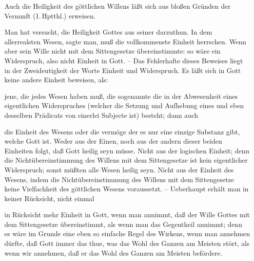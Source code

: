 Auch die Heiligkeit des göttlichen Willens läßt sich aus bloßen Gründen der Vernunft (1.\,Hptthl.) erweisen.
\begin{RWanm} 
Man hat versucht, die Heiligkeit Gottes aus seiner  darzuthun. In dem allerrealsten Wesen, sagte man, muß die vollkommenste Einheit herrschen. Wenn aber sein Wille nicht mit dem Sittengesetze übereinstimmte: so wäre ein Widerspruch, also nicht Einheit in Gott. -- Das Fehlerhafte dieses Beweises liegt in der Zweideutigkeit der Worte Einheit und Widerspruch. Es läßt sich in Gott keine andere Einheit beweisen, als:
\begin{aufzb}[1.]
\item jene, die jedes Wesen haben muß, die sogenannte  die in der Abwesenheit eines eigentlichen Widerspruches (welcher die Setzung und Aufhebung eines und eben desselben Prädicats von einerlei Subjecte ist) besteht; dann auch
\item die Einheit des Wesens oder die  vermöge der es nur eine einzige Substanz gibt, welche Gott ist. Weder aus der Einen, noch aus der andern dieser beiden Einheiten folgt, daß Gott heilig seyn müsse. Nicht aus der logischen Einheit; denn die Nichtübereinstimmung des Willens mit dem Sittengesetze ist kein eigentlicher Widerspruch; sonst müßten alle Wesen heilig seyn. Nicht aus der Einheit des Wesens, indem die Nichtübereinstimmung des Willens mit dem Sittengesetze keine Vielfachheit des göttlichen Wesens voraussetzt. -- Ueberhaupt erhält man in keiner Rücksicht, nicht einmal
\item in Rücksicht  mehr Einheit in Gott, wenn man annimmt, daß der Wille Gottes mit dem Sittengesetze übereinstimmt, als wenn man das Gegentheil annimmt; denn es wäre im Grunde eine eben so einfache Regel des Wirkens, wenn man annehmen dürfte, daß Gott immer das thue, was das Wohl des Ganzen am Meisten stört, als wenn wir annehmen, daß er das Wohl des Ganzen am Meisten befördere.
\end{aufzb}
\end{RWanm}
